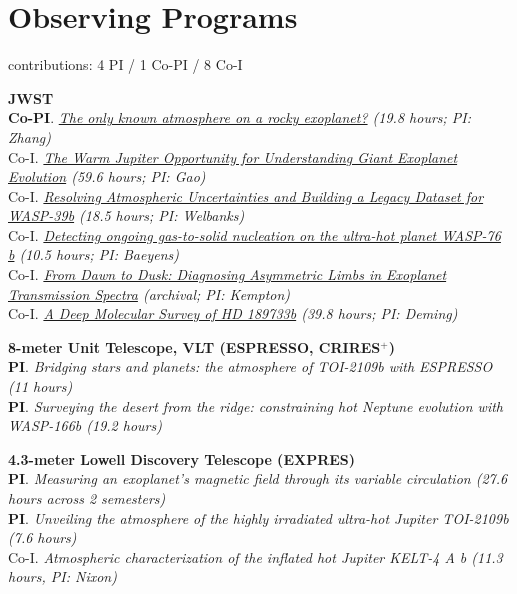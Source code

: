 \documentclass[letterpaper,10.5pt]{article}
\newcommand{\shorterSection}[1]{\vspace{-10pt}\section{#1}}
\begin{document}
\shorterSection{Observing Programs}
contributions: 4 PI / 1 Co-PI / 8 Co-I
 
\small
  \begin{list}{}{\cvlist}  
  

  
  
  \item[{\color{numcolor}}]\textbf{JWST} \\
\textbf{Co-PI}. \textit{\href{https://www.stsci.edu/jwst/science-execution/program-information?id=7875}{The only known atmosphere on a rocky exoplanet?} (19.8 hours; PI: Zhang)} \\
Co-I. \textit{\href{https://www.stsci.edu/jwst/science-execution/program-information?id=9025}{The Warm Jupiter Opportunity for Understanding Giant Exoplanet Evolution} (59.6 
 hours; PI: Gao)} \\
Co-I. \textit{\href{https://www.stsci.edu/jwst/science-execution/program-information?id=8017}{Resolving Atmospheric Uncertainties and Building a Legacy Dataset for WASP-39b} (18.5 hours; PI: Welbanks)} \\
  Co-I. \textit{\href{https://www.stsci.edu/jwst/science-execution/program-information?id=6045}{Detecting ongoing gas-to-solid nucleation on the ultra-hot planet WASP-76 b} (10.5 hours; PI: Baeyens)} \\
  Co-I. \textit{\href{https://www.stsci.edu/jwst/science-execution/program-information?id=5275}{From Dawn to Dusk: Diagnosing Asymmetric Limbs in Exoplanet Transmission Spectra} (archival; PI: Kempton)} \\ 
  Co-I. \textit{\href{https://www.stsci.edu/jwst/science-execution/program-information?id=1633}{A Deep Molecular Survey of HD 189733b} (39.8 hours; PI: Deming)}

  \item[{\color{numcolor}}]\textbf{8-meter Unit Telescope, VLT (ESPRESSO, CRIRES$^+$)} \\
\textbf{PI}. \textit{Bridging stars and planets: the atmosphere of TOI-2109b with ESPRESSO (11 hours)} \\
\textbf{PI}. \textit{Surveying the desert from the ridge: constraining hot Neptune evolution with WASP-166b (19.2 hours)} \\

  \item[{\color{numcolor}}]\textbf{4.3-meter Lowell Discovery Telescope (EXPRES)} \\
      \textbf{PI}. \textit{Measuring an exoplanet’s magnetic field through its variable circulation (27.6 hours across 2 semesters)}\\
     \textbf{PI}. \textit{Unveiling the atmosphere of the highly irradiated ultra-hot Jupiter TOI-2109b (7.6 hours)}\\
     Co-I. \textit{Atmospheric characterization of the inflated hot Jupiter KELT-4 A b (11.3 hours, PI: Nixon)}


\end{list}
\end{document}
